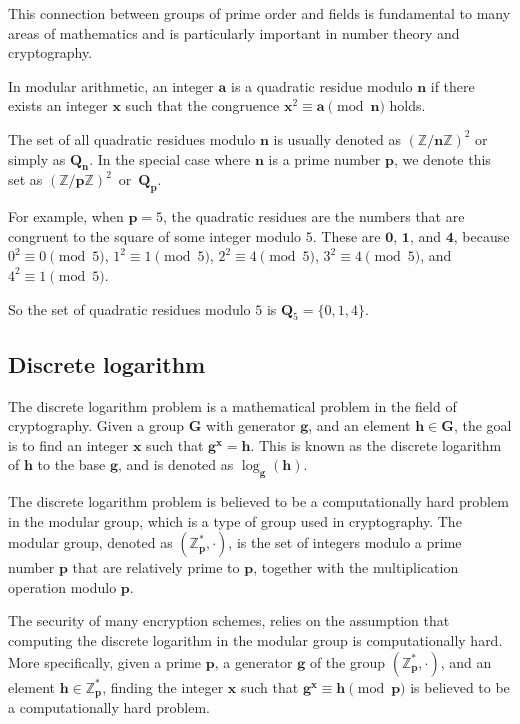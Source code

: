 This connection between groups of prime order and fields is fundamental to many areas of mathematics and is particularly important in number theory and cryptography.

In modular arithmetic, an integer $\mathbf{a}$ is a quadratic residue modulo $\mathbf{n}$ if there exists an integer $\mathbf{x}$ such that the congruence $\mathbf{x}^2 \equiv \mathbf{a} \pmod{\mathbf{n}}$ holds.

The set of all quadratic residues modulo $\mathbf{n}$ is usually denoted as $(\mathbb{Z}/\mathbf{n}\mathbb{Z})^2$ or simply as $\mathbf{Q_n}$. In the special case where $\mathbf{n}$ is a prime number $\mathbf{p}$, we denote this set as $(\mathbb{Z}/\mathbf{p}\mathbb{Z})^2$~or~$\mathbf{Q_p}$.

For example, when $\mathbf{p}=5$, the quadratic residues are the numbers that are congruent to the square of some integer modulo $5$. These are $\mathbf{0}$, $\mathbf{1}$, and $\mathbf{4}$, because $0^2 \equiv 0 \pmod{5}$, $1^2 \equiv 1 \pmod{5}$, $2^2 \equiv 4 \pmod{5}$, $3^2 \equiv 4 \pmod{5}$, and $4^2 \equiv 1 \pmod{5}$.

So the set of quadratic residues modulo $5$ is $\mathbf{Q}_5 = \{{0}, {1}, {4}\}$.

\subsection{Discrete logarithm}

The discrete logarithm problem is a mathematical problem in the field of cryptography. Given a group $\boldsymbol{G}$ with generator $\boldsymbol{g}$, and an element $\boldsymbol{h} \in \boldsymbol{G}$, the goal is to find an integer $\boldsymbol{x}$ such that $\boldsymbol{g}^{\boldsymbol{x}} = \boldsymbol{h}$. This is known as the discrete logarithm of $\boldsymbol{h}$ to the base $\boldsymbol{g}$, and is denoted as $\log_{\boldsymbol{g}}(\boldsymbol{h})$.

The discrete logarithm problem is believed to be a computationally hard problem in the modular group, which is a type of group used in cryptography. The modular group, denoted as $(\mathbb{Z}_{\boldsymbol{p}}^{*}, \cdot)$, is the set of integers modulo a prime number $\boldsymbol{p}$ that are relatively prime to $\boldsymbol{p}$, together with the multiplication operation modulo $\boldsymbol{p}$.

The security of many encryption schemes, relies on the assumption that computing the discrete logarithm in the modular group is computationally hard. More specifically, given a prime $\boldsymbol{p}$, a generator $\boldsymbol{g}$ of the group $(\mathbb{Z}_{\boldsymbol{p}}^{*}, \cdot)$, and an element $\boldsymbol{h} \in \mathbb{Z}_{\boldsymbol{p}}^*$, finding the integer $\boldsymbol{x}$ such that $\boldsymbol{g}^{\boldsymbol{x}} \equiv \boldsymbol{h} \pmod{\boldsymbol{p}}$ is believed to be a computationally hard problem.

